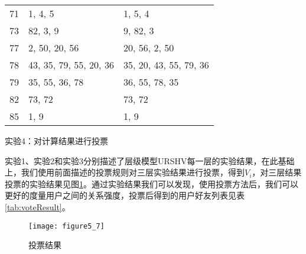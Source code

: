 \begin{table}[htbp]
\begin{tabular}{cll}
      71 & 1, 4, 5 & 1, 5, 4\\
      73 & 82, 3, 9 & 9, 82, 3\\
      77 & 2, 50, 20, 56 & 20, 56, 2, 50\\
      78 & 43, 35, 79, 55, 20, 36 & 35, 20, 43, 55, 79, 36\\
      79 & 35, 55, 36, 78 & 36, 55, 78, 35\\
      82 & 73, 72 & 73, 72\\
      85 & 1, 9 & 1, 9\\
      \bottomrule[1.5pt]
    \end{tabular}
\end{table}
\par 实验4：对计算结果进行投票
\par 实验1、实验2和实验3分别描述了层级模型URSHV每一层的实验结果，在此基础上，我们使用前面描述的投票规则对三层实验结果进行投票，得到$V_{i}$，对三层结果投票的实验结果见图\ref{fig:5_7}。通过实验结果我们可以发现，使用投票方法后，我们可以更好的度量用户之间的关系强度，投票后得到的用户好友列表见表\ref{tab:voteResult}。
\begin{figure}[htp]
\centering
\texttt{[image: figure5\_7]}
\caption{投票结果}
\label{fig:5_7}
\end{figure}
